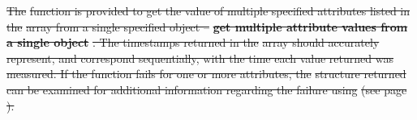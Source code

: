 \documentclass[12pt]{report} %
\providecommand{\DIFdeltex}[1]{{\protect\color{red}\sout{#1}}}                      %
\providecommand{\DIFdel}[1]{\texorpdfstring{\DIFdeltex{#1}}{}} %
\begin{document}
\DIFdel{The }%
\DIFdel{function is provided to get the value of multiple specified attributes listed in the }%
\DIFdel{array from a single specified object -- }\textbf{\DIFdel{get multiple attribute values from a single object}}%
\DIFdel{.
The timestamps returned in the }%
\DIFdel{array should accurately represent, and correspond sequentially, with the time each value returned was measured.
If the function fails for one or more attributes, the }%
\DIFdel{structure returned can be examined for additional information regarding the failure using }%
\DIFdel{(see page \pageref{func:StatusPopError}).
}%
\end{document}
